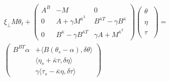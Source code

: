 \begin{multline}
\label{eq:4}
\xi_\perp M \theta_t + 
\begin{pmatrix}
A^B &  - M & 0 \\
0 & 
  A
+ \gamma  M^{\bar \kappa^2} &
  B^{\bar\kappa T}
- \gamma B^{\bar\kappa} \\
0 & 
  B^{\bar\kappa}
- \gamma B^{\bar\kappa T} 
&
%
%
\gamma  A
+  M^{\bar \kappa^2}
\end{pmatrix}
%
\begin{pmatrix}
\theta\phantom{\big|\!\!}\\
\eta\phantom{\big|\!\!} \\
\tau\phantom{\big|\!\!}
\end{pmatrix}
=\\
\begin{pmatrix}
 B^{BT}\alpha & +\langle B(\theta_s-\alpha), \delta \theta\rangle\\
& \langle \eta_s+\bar\kappa\tau,\delta\eta\rangle
\\
&\gamma\langle\tau_{s}-\bar \kappa\eta, \delta\tau\rangle 
\end{pmatrix}
\end{multline}


